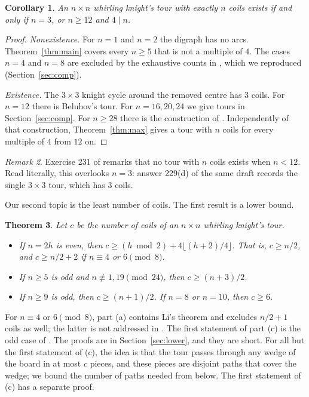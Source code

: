 \documentclass[11pt]{amsart}
\newtheorem{theorem}{Theorem}
\newtheorem{corollary}[theorem]{Corollary}
\theoremstyle{remark}
\newtheorem{remark}[theorem]{Remark}
\begin{document}
\begin{corollary}\label{cor:iff}
An $n\times n$ whirling knight's tour with exactly $n$ coils exists if and only if $n=3$, or $n\ge12$ and $4\mid n$.
\end{corollary}
\begin{proof}
\emph{Nonexistence.} For $n=1$ and $n=2$ the digraph has no arcs. Theorem~\ref{thm:main} covers every $n\ge5$ that
is not a multiple of $4$. The cases $n=4$ and
$n=8$ are excluded by the exhaustive counts in \cite[answer 229]{knuth}, which we reproduced (Section~\ref{sec:comp}).

\emph{Existence.} The $3\times3$ knight cycle around the removed centre has $3$ coils. For $n=12$ there is Beluhov's
tour. For $n=16,20,24$ we give tours in Section~\ref{sec:comp}. For $n\ge28$ there is the construction of
\cite[answer 232]{knuth}. Independently of that construction, Theorem~\ref{thm:max} gives a tour with $n$ coils for
every multiple of $4$ from $12$ on.
\end{proof}

\begin{remark}
Exercise 231 of \cite{knuth} remarks that no tour with $n$ coils exists when $n<12$. Read literally, this overlooks
$n=3$: answer
229(d) of the same draft records the single $3\times3$ tour, which has $3$ coils.
\end{remark}

Our second topic is the least number of coils. The first result is a lower bound.
\begin{theorem}\label{thm:lower}
Let $c$ be the number of coils of an $n\times n$ whirling knight's tour.
\begin{itemize}
\item[(a)] If $n=2h$ is even, then $c\ge(h\bmod2)+4\lfloor(h+2)/4\rfloor$. That is, $c\ge n/2$, and $c\ge n/2+2$ if
$n\equiv4$ or $6\pmod 8$.
\item[(b)] If $n\ge5$ is odd and $n\not\equiv1,19\pmod{24}$, then $c\ge(n+3)/2$.
\item[(c)] If $n\ge9$ is odd, then $c\ge(n+1)/2$. If $n=8$ or $n=10$, then $c\ge6$.
\end{itemize}
\end{theorem}
For $n\equiv4$ or $6\pmod 8$, part (a) contains Li's theorem and excludes $n/2+1$ coils as well; the latter is not
addressed in \cite{li}. The first statement of part (c) is the odd case of \cite[exercise 229(c)]{knuth}. The
proofs are in Section~\ref{sec:lower}, and they are short. For all but the first statement of (c), the idea is that
the tour passes through any wedge of the board in at most $c$ pieces, and these pieces are disjoint paths that cover
the wedge; we bound the number of paths needed from below. The first statement of (c) has a separate proof.
\end{document}
